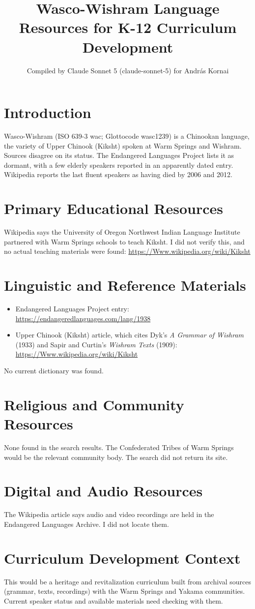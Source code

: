 \documentclass[12pt]{article}
\title{Wasco-Wishram Language Resources for K-12 Curriculum Development}
\author{Compiled by Claude Sonnet 5 (claude-sonnet-5) for Andr\'as Kornai}
\date{}
\begin{document}
\maketitle

\section{Introduction}
Wasco-Wishram (ISO 639-3 wac; Glottocode wasc1239) is a Chinookan language, the variety of Upper Chinook (Kiksht) spoken at Warm Springs and Wishram. Sources disagree on its status. The Endangered Languages Project lists it as dormant, with a few elderly speakers reported in an apparently dated entry. Wikipedia reports the last fluent speakers as having died by 2006 and 2012.

\section{Primary Educational Resources}
Wikipedia says the University of Oregon Northwest Indian Language Institute partnered with Warm Springs schools to teach Kiksht. I did not verify this, and no actual teaching materials were found: \url{https://Www.wikipedia.org/wiki/Kiksht}

\section{Linguistic and Reference Materials}
\begin{itemize}
\item Endangered Languages Project entry: \url{https://endangeredlanguages.com/lang/1938}
\item Upper Chinook (Kiksht) article, which cites Dyk's \emph{A Grammar of Wishram} (1933) and Sapir and Curtin's \emph{Wishram Texts} (1909): \url{https://Www.wikipedia.org/wiki/Kiksht}
\end{itemize}
No current dictionary was found.

\section{Religious and Community Resources}
None found in the search results. The Confederated Tribes of Warm Springs would be the relevant community body. The search did not return its site.

\section{Digital and Audio Resources}
The Wikipedia article says audio and video recordings are held in the Endangered Languages Archive. I did not locate them.

\section{Curriculum Development Context}
This would be a heritage and revitalization curriculum built from archival sources (grammar, texts, recordings) with the Warm Springs and Yakama communities. Current speaker status and available materials need checking with them.
\end{document}
